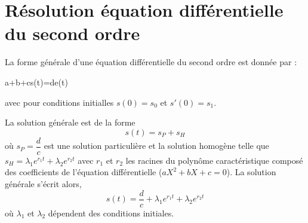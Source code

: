 \section{Résolution équation différentielle du second ordre}
La forme générale d'une équation différentielle du second ordre est
donnée par : 
\begin{bequation}
    a+b+cs(t)=d\cdot e(t)
\end{bequation}
avec pour conditions initialles $s(0)=s_0$ et $s'(0)=s_1$.

La solution générale est de la forme 
\[
    s(t)=s_P+s_H
\]
où $s_P=\dfrac{d}{c}$ est une solution particulière et la solution homogène 
telle que $s_H=\lambda_1 e^{r_1 t}+
\lambda_2 e^{r_2 t}$ avec $r_1$ et $r_2$ les racines du polynôme 
caractéristique composé des coefficients de l'équation différentielle 
($aX^2+bX+c=0$).
La solution générale s'écrit alors,
\[
    s(t)=\dfrac{d}{c}+\lambda_1 e^{r_1 t}+\lambda_2 e^{r_2 t}
\]
où $\lambda_1$ et $\lambda_2$ dépendent des conditions initiales. 

